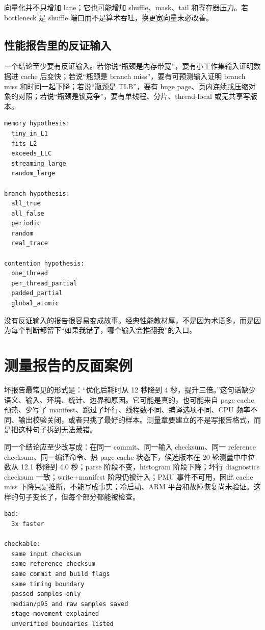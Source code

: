 向量化并不只增加 lane；它也可能增加 shuffle、mask、tail 和寄存器压力。若 bottleneck 是 shuffle 端口而不是算术吞吐，换更宽向量未必改善。

\subsection{性能报告里的反证输入}

一个结论至少要有反证输入。若你说“瓶颈是内存带宽”，要有小工作集输入证明数据进 cache 后变快；若说“瓶颈是 branch miss”，要有可预测输入证明 branch miss 和时间一起下降；若说“瓶颈是 TLB”，要有 huge page、页内连续或压缩对象的对照；若说“瓶颈是锁竞争”，要有单线程、分片、thread-local 或无共享写版本。

\begin{lstlisting}[numbers=none,caption={反证输入矩阵}]
memory hypothesis:
  tiny_in_L1
  fits_L2
  exceeds_LLC
  streaming_large
  random_large

branch hypothesis:
  all_true
  all_false
  periodic
  random
  real_trace

contention hypothesis:
  one_thread
  per_thread_partial
  padded_partial
  global_atomic
\end{lstlisting}

没有反证输入的报告很容易变成故事。经典性能教材厚，不是因为术语多，而是因为每个判断都留下“如果我错了，哪个输入会推翻我”的入口。

\section{测量报告的反面案例}

坏报告最常见的形式是：“优化后耗时从 12 秒降到 4 秒，提升三倍。”这句话缺少语义、输入、环境、统计、边界和原因。它可能是真的，也可能来自 page cache 预热、少写了 manifest、跳过了坏行、线程数不同、编译选项不同、CPU 频率不同、输出校验关闭，或者只挑了最好的样本。测量章要建立的不是写报告格式，而是把这种句子拆到无法藏错。

同一个结论应至少改写成：在同一 commit、同一输入 checksum、同一 reference checksum、同一编译命令、热 page cache 状态下，候选版本在 20 轮测量中中位数从 12.1 秒降到 4.0 秒；parse 阶段不变，histogram 阶段下降；坏行 diagnostics checksum 一致；write+manifest 阶段仍被计入；PMU 事件不可用，因此 cache miss 下降只是推断，不能写成事实；冷启动、ARM 平台和故障恢复尚未验证。这样的句子变长了，但每个部分都能被检查。

\begin{lstlisting}[numbers=none,caption={坏报告到好报告的字段展开}]
bad:
  3x faster

checkable:
  same input checksum
  same reference checksum
  same commit and build flags
  same timing boundary
  passed samples only
  median/p95 and raw samples saved
  stage movement explained
  unverified boundaries listed
\end{lstlisting}

